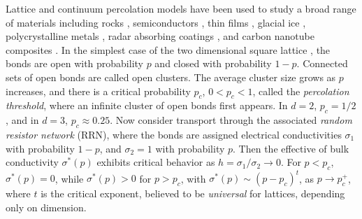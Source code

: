 \documentclass[english,12pt]{ttuthes}
\begin{document}
Lattice and continuum percolation models have been used to study a
broad range of materials including rocks
\cite{Bourbie:JGR-11524,Broadbent:PCPS-629}, semiconductors
\cite{Efros-84}, thin films \cite{Davis:OC-70}, glacial ice
\cite{Enting:1985:LSM}, polycrystalline metals \cite{Chen:PRL-035701},
radar absorbing coatings \cite{Kusy:N-58}, and carbon nanotube
composites \cite{Kyrylyuk:PNAS-8221}. In the simplest case of the two
dimensional square lattice \cite{Stauffer-92,Torquato:RHM-02}, the
bonds are open with probability $p$ and closed with probability
$1-p$. Connected sets of open bonds are called open clusters. The
average cluster size grows as $p$ increases, and there is a critical
probability $p_c$, $0<p_c<1$, called the \emph{percolation threshold},
where an infinite cluster of open bonds first appears. In $d=2$,
$p_c=1/2$, and in $d=3$, $p_c\approx0.25$. Now consider transport through
the associated \emph{random resistor network} (RRN), where the bonds
are assigned electrical conductivities $\sigma_1$ with probability $1-p$,
and $\sigma_2=1$ with probability $p$. Then the effective of bulk
conductivity $\sigma^*(p)$ exhibits critical behavior as $h=\sigma_1/\sigma_2\to0$. For
$p<p_c$, $\sigma^*(p)=0$, while $\sigma^*(p)>0$ for $p>p_c$, with
$\sigma^*(p)\sim(p-p_c)^t$, as $p\to p_c^+$, where $t$ is the critical exponent,
believed to be \emph{universal} for lattices, depending only on
dimension.
\end{document}
